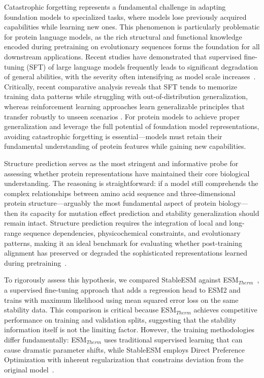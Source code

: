 \documentclass[]{fairmeta}
\begin{document}
Catastrophic forgetting represents a fundamental challenge in adapting foundation models to specialized tasks, where models lose previously acquired capabilities while learning new ones. This phenomenon is particularly problematic for protein language models, as the rich structural and functional knowledge encoded during pretraining on evolutionary sequences forms the foundation for all downstream applications. Recent studies have demonstrated that supervised fine-tuning (SFT) of large language models frequently leads to significant degradation of general abilities, with the severity often intensifying as model scale increases~\citep{luo2023empirical, li2024revisiting, ding2025improved}. Critically, recent comparative analysis reveals that SFT tends to memorize training data patterns while struggling with out-of-distribution generalization, whereas reinforcement learning approaches learn generalizable principles that transfer robustly to unseen scenarios \cite{chu2025sft}. For protein models to achieve proper generalization and leverage the full potential of foundation model representations, avoiding catastrophic forgetting is essential—models must retain their fundamental understanding of protein features while gaining new capabilities.

Structure prediction serves as the most stringent and informative probe for assessing whether protein representations have maintained their core biological understanding. The reasoning is straightforward: if a model still comprehends the complex relationships between amino acid sequence and three-dimensional protein structure—arguably the most fundamental aspect of protein biology—then its capacity for mutation effect prediction and stability generalization should remain intact. Structure prediction requires the integration of local and long-range sequence dependencies, physicochemical constraints, and evolutionary patterns, making it an ideal benchmark for evaluating whether post-training alignment has preserved or degraded the sophisticated representations learned during pretraining~\citep{lin2023evolutionary}.

To rigorously assess this hypothesis, we compared StableESM against ESM$_{Therm}$~\citep{chu2024protein}, a supervised fine-tuning approach that adds a regression head to ESM2 and trains with maximum likelihood using mean squared error loss on the same stability data. This comparison is critical because ESM$_{Therm}$ achieves competitive performance on training and validation splits, suggesting that the stability information itself is not the limiting factor. However, the training methodologies differ fundamentally: ESM$_{Therm}$ uses traditional supervised learning that can cause dramatic parameter shifts, while StableESM employs Direct Preference Optimization with inherent regularization that constrains deviation from the original model~\citep{rafailov2023direct}.
\end{document}
